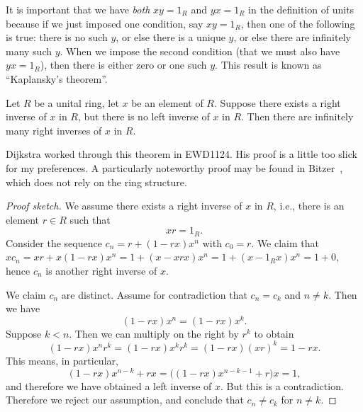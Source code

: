 \begin{remark}
It is important that we have \emph{both} $xy=1_{R}$ and $yx=1_{R}$ in
the definition of units because if we just imposed one condition, say
$xy=1_{R}$, then one of the following is true: there is no such $y$,
or else there is a unique $y$, or else there are infinitely many such $y$.
When we impose the second condition (that we must also have $yx=1_{R}$),
then there is either zero or one such $y$. This result is known as
``Kaplansky's theorem''.
\end{remark}

\begin{theorem}
Let $R$ be a unital ring, let $x$ be an element of $R$.
Suppose there exists a right inverse of $x$ in $R$, but there is no
left inverse of $x$ in $R$. Then there are infinitely many right
inverses of $x$ in $R$.
\end{theorem}

Dijkstra worked through this theorem in EWD1124. His proof is a little
too slick for my preferences. A particularly noteworthy proof may be
found in Bitzer~\cite{bitzer1963inverses}, which does not rely on the
ring structure.

\begin{proof}[Proof sketch]
We assume there exists a right inverse of $x$ in $R$, i.e., there is
an element $r\in R$ such that
\begin{equation}
xr = 1_{R}.
\end{equation}
Consider the sequence $c_{n}=r+(1-rx)x^{n}$ with $c_{0}=r$. We claim
that $xc_{n}=xr+x(1-rx)x^{n}=1+(x-xrx)x^{n}=1+(x-1_{R}x)x^{n}=1+0$,
hence $c_{n}$ is another right inverse of $x$.

We claim $c_{n}$ are distinct. Assume for contradiction that
$c_{n}=c_{k}$ and $n\neq k$. Then we have
\begin{equation}
(1-rx)x^{n}=(1-rx)x^{k}.
\end{equation}
Suppose $k<n$. Then we can multiply on the right by $r^{k}$ to obtain
\begin{equation}
(1-rx)x^{n}r^{k}=(1-rx)x^{k}r^{k}=(1-rx)(xr)^{k}=1-rx.
\end{equation}
This means, in particular,
\begin{equation}
(1-rx)x^{n-k}+rx = \bigl((1-rx)x^{n-k-1}+r\bigr)x=1,
\end{equation}
and therefore we have obtained a left inverse of $x$. But this is a
contradiction. Therefore we reject our assumption, and conclude that
$c_{n}\neq c_{k}$ for $n\neq k$.
\end{proof}

